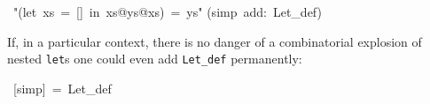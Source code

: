 \begin{isabelle}%
~{"}(let~xs~=~[]~in~xs@ys@xs)~=~ys{"}\isanewline
{}(simp~add:~Let\_def)%
\begin{isamarkuptext}%
If, in a particular context, there is no danger of a combinatorial explosion
of nested \texttt{let}s one could even add \texttt{Let_def} permanently:%
\end{isamarkuptext}%
~[simp]~=~Let\_def\end{isabelle}%
